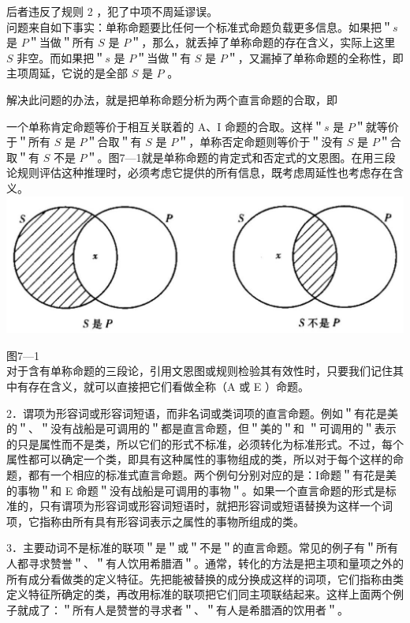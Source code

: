 后者违反了规则 2 ，犯了中项不周延谬误。\\
问题来自如下事实：单称命题要比任何一个标准式命题负载更多信息。如果把＂$s$ 是 $P$＂当做＂所有 $S$ 是 $P$＂，那么，就丢掉了单称命题的存在含义，实际上这里 $S$ 非空。而如果把＂$s$ 是 $P$＂当做＂有 $S$ 是 $P$＂，又漏掉了单称命题的全称性，即主项周延，它说的是全部 $S$ 是 $P$ 。

解决此问题的办法，就是把单称命题分析为两个直言命题的合取，即

一个单称肯定命题等价于相互关联着的 A、I 命题的合取。这样＂$s$ 是 $P$＂就等价于＂所有 $S$ 是 $P$＂合取＂有 $S$ 是 $P$＂，单称否定命题则等价于＂没有 $S$ 是 $P$＂合取＂有 $S$ 不是 $P$＂。图7—1就是单称命题的肯定式和否定式的文恩图。在用三段论规则评估这种推理时，必须考虑它提供的所有信息，既考虑周延性也考虑存在含义。\\
\includegraphics[width=\textwidth]{images/2025_05_15_6a28331d5e7c993ad07ag-310.jpg}

图7—1\\
对于含有单称命题的三段论，引用文恩图或规则检验其有效性时，只要我们记住其中有存在含义，就可以直接把它们看做全称（A 或 E ）命题。

2．谓项为形容词或形容词短语，而非名词或类词项的直言命题。例如＂有花是美的＂、＂没有战船是可调用的＂都是直言命题，但＂美的＂和 ＂可调用的＂表示的只是属性而不是类，所以它们的形式不标准，必须转化为标准形式。不过，每个属性都可以确定一个类，即具有这种属性的事物组成的类，所以对于每个这样的命题，都有一个相应的标准式直言命题。两个例句分别对应的是：I命题＂有花是美的事物＂和 E 命题＂没有战船是可调用的事物＂。如果一个直言命题的形式是标准的，只有谓项为形容词或形容词短语时，就把形容词或短语替换为这样一个词项，它指称由所有具有形容词表示之属性的事物所组成的类。

3．主要动词不是标准的联项＂是＂或＂不是＂的直言命题。常见的例子有＂所有人都寻求赞誉＂、＂有人饮用希腊酒＂。通常，转化的方法是把主项和量项之外的所有成分看做类的定义特征。先把能被替换的成分换成这样的词项，它们指称由类定义特征所确定的类，再改用标准的联项把它们同主项联结起来。这样上面两个例子就成了：＂所有人是赞誉的寻求者＂、＂有人是希腊酒的饮用者＂。

